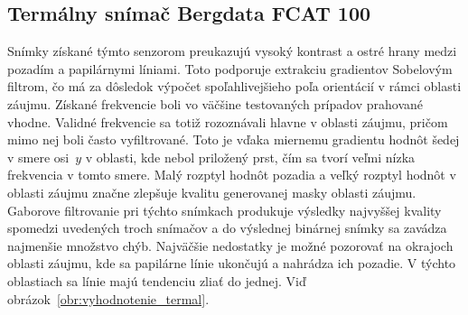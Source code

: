   \subsection{Termálny snímač Bergdata FCAT 100}
  Snímky získané týmto senzorom preukazujú vysoký kontrast a ostré hrany medzi pozadím a papilárnymi líniami. Toto podporuje extrakciu gradientov Sobelovým
  filtrom, čo má za dôsledok výpočet spoľahlivejšieho poľa orientácií v rámci oblasti záujmu. Získané frekvencie boli vo väčšine testovaných prípadov
  prahované vhodne. Validné frekvencie sa totiž rozoznávali hlavne v oblasti záujmu, pričom mimo nej boli často vyfiltrované. Toto je vďaka miernemu gradientu
  hodnôt šedej v smere osi~{$y$} v oblasti, kde nebol priložený prst, čím sa tvorí veľmi nízka frekvencia v tomto smere.
  Malý rozptyl hodnôt pozadia a veľký rozptyl hodnôt v oblasti záujmu značne zlepšuje kvalitu generovanej masky oblasti záujmu.
  Gaborove filtrovanie pri týchto snímkach produkuje výsledky najvyššej kvality spomedzi uvedených troch snímačov a do výslednej binárnej snímky sa zavádza
  najmenšie množstvo chýb. Najväčšie nedostatky je možné pozorovať na okrajoch
  oblasti záujmu, kde sa papilárne línie ukončujú a nahrádza ich pozadie. V týchto oblastiach sa línie majú tendenciu zliať do jednej.
  Viď obrázok~{\ref{obr:vyhodnotenie_termal}}.
